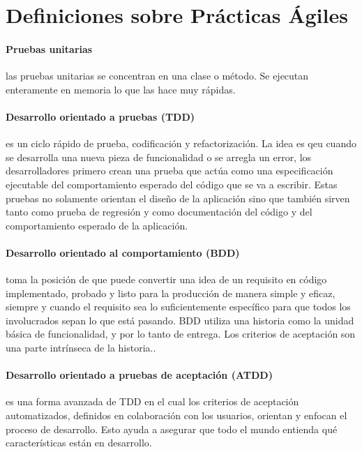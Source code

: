 \documentclass[journal]{IEEEtran}
\begin{document}
\section{Definiciones sobre Prácticas Ágiles}\label{apendice:b}

\paragraph{Pruebas unitarias} las pruebas unitarias se concentran en una clase o método. Se ejecutan enteramente en memoria lo que las hace muy rápidas\cite{shore-warden}.

\paragraph{Desarrollo orientado a pruebas (TDD)} es un ciclo rápido de prueba, codificación y refactorización\cite{shore-warden}. La idea es qeu cuando se desarrolla una nueva pieza de funcionalidad o se arregla un error, los desarrolladores primero crean una prueba que actúa como una especificación ejecutable del comportamiento esperado del código que se va a escribir. Estas pruebas no solamente orientan el diseño de la aplicación sino que también sirven tanto como prueba de regresión y como documentación del código y del comportamiento esperado de la aplicación.\cite{humble}

\paragraph{Desarrollo orientado al comportamiento (BDD)} toma la posición de que puede convertir una idea de un requisito en código implementado, probado y listo para la producción de manera simple y eficaz, siempre y cuando el requisito sea lo suficientemente específico para que todos los involucrados sepan lo que está pasando. BDD utiliza una historia como la unidad básica de funcionalidad, y por lo tanto de entrega. Los criterios de aceptación son una parte intrínseca de la historia.\cite{michael-b}. 

\paragraph{Desarrollo orientado a pruebas de aceptación (ATDD)} es una forma avanzada de TDD en el cual los criterios de aceptación automatizados, definidos en colaboración con los usuarios, orientan y enfocan el proceso de desarrollo. Esto ayuda a asegurar que todo el mundo entienda qué características están en desarrollo.
\end{document}
